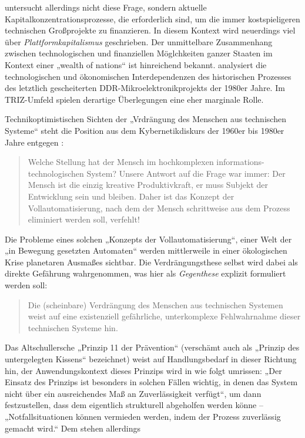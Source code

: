 \documentclass[11pt,a4paper]{article}
\begin{document}
\cite{Goldberg2016} untersucht allerdings nicht diese Frage, sondern aktuelle
Kapitalkonzentrationsprozesse, die erforderlich sind, um die immer
kostspieligeren technischen Großprojekte zu finanzieren.  In diesem Kontext
wird neuerdings viel über \emph{Plattformkapitalismus} geschrieben.  Der
unmittelbare Zusammenhang zwischen technologischen und finanziellen
Möglchkeiten ganzer Staaten im Kontext einer „wealth of nations“ ist
hinreichend bekannt. \cite{Barkleit2000}  analysiert die technologischen und
ökonomischen Interdependenzen des historischen Prozesses des letztlich
gescheiterten DDR-Mikroelektronikprojekts der 1980er Jahre. Im TRIZ-Umfeld
spielen derartige Überlegungen eine eher marginale Rolle.

Technikoptimistischen Sichten der „Vrdrängung des Menschen aus technischen
Systeme“ steht die Position aus dem Kybernetikdiskurs der 1960er bis 1980er
Jahre entgegen \cite[S. 10]{KFK2000}:
\begin{quote}
  Welche Stellung hat der Mensch im hochkomplexen informations-technologischen
  System? Unsere Antwort auf die Frage war immer: Der Mensch ist die einzig
  kreative Produktivkraft, er muss Subjekt der Entwicklung sein und bleiben.
  Daher ist das Konzept der Vollautomatisierung, nach dem der Mensch
  schrittweise aus dem Prozess eliminiert werden soll, verfehlt!
\end{quote}
Die Probleme eines solchen „Konzepts der Vollautomatisierung“, einer Welt der
„in Bewegung gesetzten Automaten“ werden mittlerweile in einer ökologischen
Krise planetaren Ausmaßes sichtbar. Die Verdrängungsthese selbst wird dabei
als direkte Gefährung wahrgenommen, was hier als \emph{Gegenthese} explizit
formuliert werden soll:
\begin{quote}
  Die (scheinbare) Verdrängung des Menschen aus technischen Systemen weist auf
  eine existenziell gefährliche, unterkomplexe Fehlwahrnahme dieser
  technischen Systeme hin.
\end{quote}
Das Altschullersche „Prinzip 11 der Prävention“ (verschämt auch als „Prinzip
des untergelegten Kissens“ bezeichnet) weist auf Handlungsbedarf in dieser
Richtung hin, der Anwendungskontext dieses Prinzips wird in \cite{TT} wie
folgt umrissen: „Der Einsatz des Prinzips ist besonders in solchen Fällen
wichtig, in denen das System nicht über ein ausreichendes Maß an
Zuverlässigkeit verfügt“, um dann festzustellen, dass dem eigentlich
strukturell abgeholfen werden könne -- „Notfallsituationen können vermieden
werden, indem der Prozess zuverlässig gemacht wird.“ Dem stehen allerdings
\end{document}
